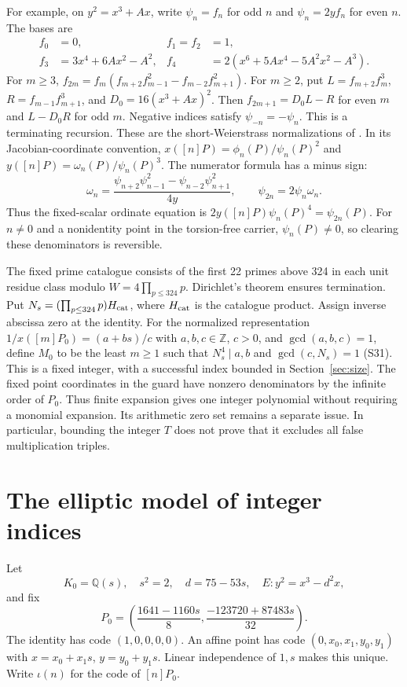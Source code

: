 \documentclass[11pt]{article}
\theoremstyle{definition}
\theoremstyle{remark}
\newcommand{\Q}{\mathbb Q}
\newcommand{\Z}{\mathbb Z}
\begin{document}
For example, on $y^2=x^3+Ax$, write $\psi_n=f_n$ for odd $n$ and
$\psi_n=2yf_n$ for even $n$. The bases are
\begin{align*}
 f_0&=0,&f_1=f_2&=1,\\
 f_3&=3x^4+6Ax^2-A^2,&
 f_4&=2(x^6+5Ax^4-5A^2x^2-A^3).
\end{align*}
For $m\ge3$,
$f_{2m}=f_m(f_{m+2}f_{m-1}^2-f_{m-2}f_{m+1}^2)$.
For $m\ge2$, put $L=f_{m+2}f_m^3$, $R=f_{m-1}f_{m+1}^3$, and
$D_0=16(x^3+Ax)^2$. Then $f_{2m+1}=D_0L-R$ for even $m$ and
$L-D_0R$ for odd $m$. Negative indices satisfy $\psi_{-n}=-\psi_n$.
This is a terminating recursion. These are the short-Weierstrass
normalizations of \cite[\S\S5.5--5.6, Lemmas 5.20 and 5.24, Theorem 5.21]{sutherland}.
In its Jacobian-coordinate convention,
$x([n]P)=\phi_n(P)/\psi_n(P)^2$ and
$y([n]P)=\omega_n(P)/\psi_n(P)^3$.
The numerator formula has a minus sign:
\[
 \omega_n=\frac{\psi_{n+2}\psi_{n-1}^2-
                   \psi_{n-2}\psi_{n+1}^2}{4y},
 \qquad \psi_{2n}=2\psi_n\omega_n.
\]
Thus the fixed-scalar ordinate equation is
$2y([n]P)\psi_n(P)^4=\psi_{2n}(P)$.
For $n\ne0$ and a nonidentity point in the torsion-free carrier,
$\psi_n(P)\ne0$, so clearing these denominators is reversible.

The fixed prime catalogue consists of the first 22 primes above 324 in
each unit residue class modulo $W=4\prod_{p\le324}p$. Dirichlet's theorem
ensures termination. Put $N_s=(\prod_{p\le324}p)H_{\rm cat}$, where
$H_{\rm cat}$ is the catalogue product. Assign inverse abscissa zero
at the identity. For the normalized representation
$1/x([m]P_0)=(a+bs)/c$ with $a,b,c\in\Z$, $c>0$, and
$\gcd(a,b,c)=1$, define $M_0$ to be the least $m\ge1$ such that
$N_s^4\mid a,b$ and $\gcd(c,N_s)=1$ (S31).
This is a fixed integer, with a successful index bounded in
Section~\ref{sec:size}.
The fixed point coordinates in the guard have nonzero denominators by
the infinite order of $P_0$. Thus finite expansion gives one integer
polynomial without requiring a monomial expansion. Its arithmetic zero
set remains a separate issue. In particular, bounding the integer $T$
does not prove that it excludes all false multiplication triples.

\section{The elliptic model of integer indices}\label{sec:model}
Let
\[
 K_0=\Q(s),\quad s^2=2,\quad d=75-53s,\quad E:y^2=x^3-d^2x,
\]
and fix
\[
 P_0=\left(\frac{1641-1160s}{8},\frac{-123720+87483s}{32}\right).
\]
The identity has code $(1,0,0,0,0)$. An affine point has code
$(0,x_0,x_1,y_0,y_1)$ with $x=x_0+x_1s$, $y=y_0+y_1s$.
Linear independence of $1,s$ makes this unique. Write $\iota(n)$ for
the code of $[n]P_0$.
\end{document}
